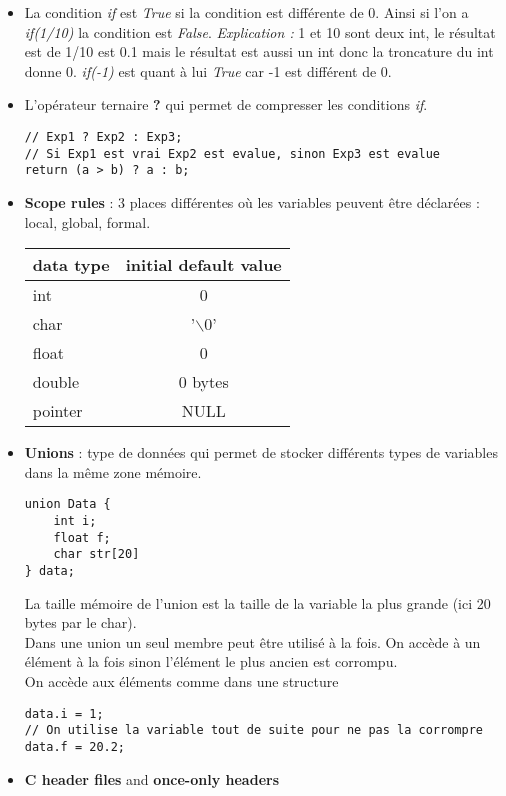 \documentclass[12pt,a4paper]{article}
\begin{document}
\begin{itemize}
\item La condition \textit{if} est \textit{True} si la condition est différente de 0. 
\newline Ainsi si l'on a \textit{if(1/10)} la condition est \textit{False}. \textit{Explication : }1 et 10 sont deux int, le résultat est de 1/10 est 0.1 mais le résultat est aussi un int donc la troncature du int donne 0.
\newline \textit{if(-1)} est quant à lui \textit{True} car -1 est différent de 0.
\item L'opérateur ternaire \textbf{?} qui permet de compresser les conditions \textit{if}.
\begin{lstlisting}
// Exp1 ? Exp2 : Exp3;
// Si Exp1 est vrai Exp2 est evalue, sinon Exp3 est evalue
return (a > b) ? a : b;
\end{lstlisting}
\item \textbf{Scope rules} : 3 places différentes où les variables peuvent être déclarées : local, global, formal.
\newline
\begin{tabular}{|l|c|}
  \hline
  data type & initial default value \\
  \hline \hline
  int & 0 \\ \hline
  char & '$\backslash0$'  \\ \hline
  float & 0 \\ \hline
  double & 0 bytes \\ \hline
  pointer & NULL \\ \hline
\end{tabular}
\item \textbf{Unions} : type de données qui permet de stocker différents types de variables dans la même zone mémoire.
\begin{lstlisting}
union Data {
	int i;
	float f;
	char str[20]
} data;
\end{lstlisting}
La taille mémoire de l'union est la taille de la variable la plus grande (ici 20 bytes par le char).\\
Dans une union un seul membre peut être utilisé à la fois. On accède à un élément à la fois sinon l'élément le plus ancien est corrompu. \\
On accède aux éléments comme dans une structure
\begin{lstlisting}
data.i = 1;
// On utilise la variable tout de suite pour ne pas la corrompre
data.f = 20.2;
\end{lstlisting}
\item \textbf{C header files} and \textbf{once-only headers}

\end{itemize}
\end{document}
